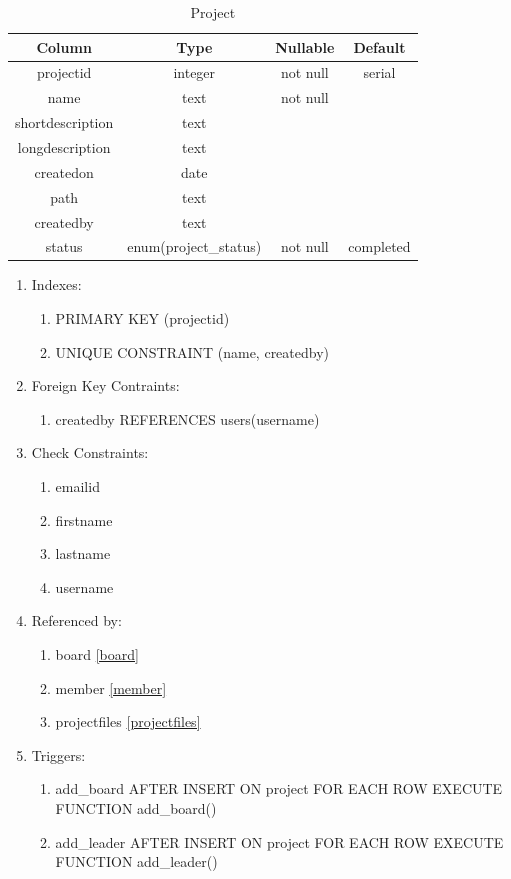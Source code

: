 \documentclass[conference,onecolumn]{IEEEtran}
\begin{document}
\begin{table}[htbp]
  \caption{Project}
  \begin{center}
    \begin{tabular}{|c|c|c|c|}
      \hline
      \textbf{Column} & \textbf{Type} & \textbf{Nullable} & \textbf{Default}\\
      \hline
      projectid & integer & not null & serial\\
      name & text & not null &\\
      shortdescription & text &&\\
      longdescription & text &&\\
      createdon & date &&\\
      path & text &&\\
      createdby & text &&\\
      status & enum(project\_status) & not null & completed\\
      \hline
    \end{tabular}
    \begin{enumerate}
    \item Indexes:
      \begin{enumerate}
      \item PRIMARY KEY (projectid)
      \item UNIQUE CONSTRAINT (name, createdby)
      \end{enumerate}
    \item Foreign Key Contraints:
      \begin{enumerate}
        \item createdby REFERENCES users(username)
      \end{enumerate}
    \item Check Constraints:
      \begin{enumerate}
      \item emailid
      \item firstname
      \item lastname
      \item username
      \end{enumerate}
    \item Referenced by:
      \begin{enumerate}
      \item board \ref{board}
      \item member \ref{member}
      \item projectfiles \ref{projectfiles}
      \end{enumerate}
    \item Triggers:
      \begin{enumerate}
        \item add\_board AFTER INSERT ON project FOR EACH ROW EXECUTE FUNCTION add\_board()
        \item add\_leader AFTER INSERT ON project FOR EACH ROW EXECUTE FUNCTION add\_leader()
      \end{enumerate}
    \end{enumerate}
    \label{project}
  \end{center}
\end{table}
\end{document}

